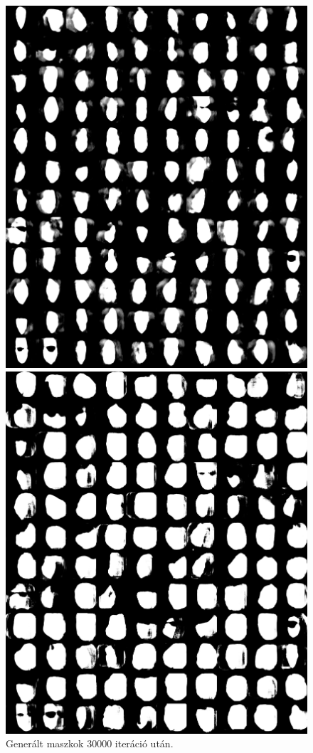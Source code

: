 \documentclass[12pt,a4]{article}
\begin{document}
\begin{figure}[h!]
\begin{minipage}[b]{0.4\textwidth}
            \includegraphics[width=\textwidth]{test-masks-30000.png}
            \caption{Generált maszkok 30000 iteráció után.}
          \end{minipage}
          \begin{minipage}[b]{0.4\textwidth}
            \includegraphics[width=\textwidth]{test-masks-90000.png}

\end{minipage}
\end{figure}
\end{document}
